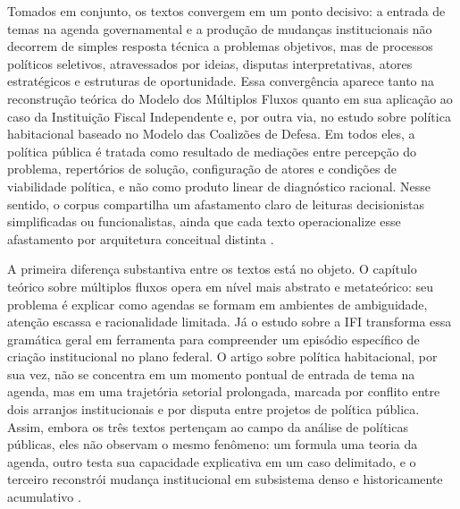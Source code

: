\documentclass[12pt,a4paper]{article}
\begin{document}
Tomados em conjunto, os textos convergem em um ponto decisivo: a entrada de temas na agenda governamental e a produção de mudanças institucionais não decorrem de simples resposta técnica a problemas objetivos, mas de processos políticos seletivos, atravessados por ideias, disputas interpretativas, atores estratégicos e estruturas de oportunidade. Essa convergência aparece tanto na reconstrução teórica do Modelo dos Múltiplos Fluxos quanto em sua aplicação ao caso da Instituição Fiscal Independente e, por outra via, no estudo sobre política habitacional baseado no Modelo das Coalizões de Defesa. Em todos eles, a política pública é tratada como resultado de mediações entre percepção do problema, repertórios de solução, configuração de atores e condições de viabilidade política, e não como produto linear de diagnóstico racional. Nesse sentido, o corpus compartilha um afastamento claro de leituras decisionistas simplificadas ou funcionalistas, ainda que cada texto operacionalize esse afastamento por arquitetura conceitual distinta \parencite{brasil2022_abordagens_contemporaneas,anonsd_sem_titulo,ferreira2019_politica_habitacional}.

A primeira diferença substantiva entre os textos está no objeto. O capítulo teórico sobre múltiplos fluxos opera em nível mais abstrato e metateórico: seu problema é explicar como agendas se formam em ambientes de ambiguidade, atenção escassa e racionalidade limitada. Já o estudo sobre a IFI transforma essa gramática geral em ferramenta para compreender um episódio específico de criação institucional no plano federal. O artigo sobre política habitacional, por sua vez, não se concentra em um momento pontual de entrada de tema na agenda, mas em uma trajetória setorial prolongada, marcada por conflito entre dois arranjos institucionais e por disputa entre projetos de política pública. Assim, embora os três textos pertençam ao campo da análise de políticas públicas, eles não observam o mesmo fenômeno: um formula uma teoria da agenda, outro testa sua capacidade explicativa em um caso delimitado, e o terceiro reconstrói mudança institucional em subsistema denso e historicamente acumulativo \parencite{brasil2022_abordagens_contemporaneas,anonsd_sem_titulo,ferreira2019_politica_habitacional}.
\end{document}
